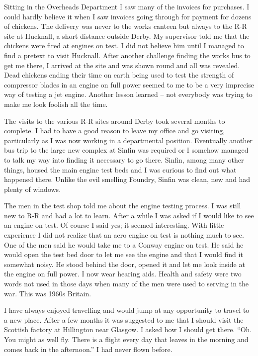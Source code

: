 Sitting in the Overheads Department I saw many of the invoices for
purchases. I could hardly believe it when I saw invoices going through
for payment for dozens of chickens. The delivery was never to the
works canteen but always to the R-R site at Hucknall, a short distance
outside Derby. My supervisor told me that the chickens were fired at
engines on test. I did not believe him until I managed to find a
pretext to visit Hucknall. After another challenge finding the works
bus to get me there, I arrived at the site and was shown round and all
was revealed. Dead chickens ending their time on earth being used to
test the strength of compressor blades in an engine on full power
seemed to me to be a very imprecise way of testing a jet
engine. Another lesson learned -- not everybody was trying to make me
look foolish all the time.

The visits to the various R-R sites around Derby took several months
to complete. I had to have a good reason to leave my office and go
visiting, particularly as I was now working in a departmental
position. Eventually another bus trip to the large new complex at
Sinfin was required or I somehow managed to talk my way into finding
it necessary to go there. Sinfin, among many other things, housed the
main engine test beds and I was curious to find out what happened
there. Unlike the evil smelling Foundry, Sinfin was clean, new and had
plenty of windows.

The men in the test shop told me about the engine testing process. I
was still new to R-R and had a lot to learn. After a while I was asked
if I would like to see an engine on test. Of course I said yes; it
seemed interesting. With little experience I did not realize that an
aero engine on test is nothing much to see. One of the men said he
would take me to a Conway engine on test. He said he would open the
test bed door to let me see the engine and that I would find it
somewhat noisy. He stood behind the door, opened it and let me look
inside at the engine on full power. I now wear hearing aids. Health
and safety were two words not used in those days when many of the men
were used to serving in the war. This was 1960s Britain.

I have always enjoyed travelling and would jump at any opportunity to
travel to a new place. After a few months it was suggested to me that
I should visit the Scottish factory at Hillington near Glasgow. I
asked how I should get there. ``Oh. You might as well fly. There is a
flight every day that leaves in the morning and comes back in the
afternoon.'' I had never flown before.


